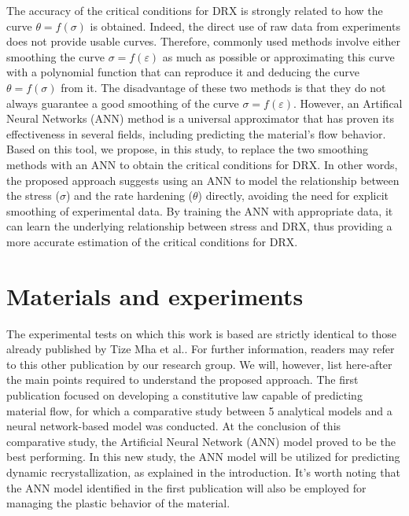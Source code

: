 \documentclass[metals,article,submit,pdftex,moreauthors]{Definitions/mdpi}
\makeatletter
\DeclareRobustCommand{\eal}{et al.\@\xspace}
\makeatother
\begin{document}
The accuracy of the critical conditions for DRX is strongly related to how the curve $\theta=f(\sigma)$ is obtained.
Indeed, the direct use of raw data from experiments does not provide usable curves.
Therefore, commonly used methods involve either smoothing the curve $\sigma=f(\varepsilon)$  as much as possible or approximating this curve with a polynomial function that can reproduce it and deducing the curve $\theta=f(\sigma)$ from it.
The disadvantage of these two methods is that they do not always guarantee a good smoothing of the curve $\sigma=f(\varepsilon)$.
However, an Artifical Neural Networks (ANN) method is a universal approximator that has proven its effectiveness in several fields, including predicting the material's flow behavior.
Based on this tool, we propose, in this study, to replace the two smoothing methods with an ANN to obtain the critical conditions for DRX.
In other words, the proposed approach suggests using an ANN to model the relationship between the stress ($\sigma$) and the rate hardening ($\theta$) directly, avoiding the need for explicit smoothing of experimental data.
By training the ANN with appropriate data, it can learn the underlying relationship between stress and DRX, thus providing a more accurate estimation of the critical conditions for DRX.
\section{Materials and experiments\label{sec:MaterialsExperiments}}
The experimental tests on which this work is based are strictly identical to those already published by Tize Mha \eal \cite{TizeMha-2023}.
For further information, readers may refer to this other publication by our research group.
We will, however, list here-after the main points required to understand the proposed approach.
The first publication focused on developing a constitutive law capable of predicting material flow, for which a comparative study between 5 analytical models and a neural network-based model was conducted.
At the conclusion of this comparative study, the Artificial Neural Network (ANN) model proved to be the best performing.
In this new study, the ANN model will be utilized for predicting dynamic recrystallization, as explained in the introduction.
It's worth noting that the ANN model identified in the first publication will also be employed for managing the plastic behavior of the material.
\end{document}
